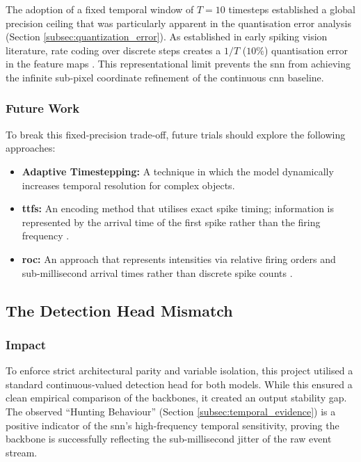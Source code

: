 The adoption of a fixed temporal window of $T=10$ timesteps established a global precision ceiling that was particularly apparent in the quantisation error analysis (Section \ref{subsec:quantization_error}). 
As established in early spiking vision literature, rate coding over discrete steps creates a $1/T$ ($10\%$) quantisation error in the feature maps \cite{THORPE2001715}. 
This representational limit prevents the \gls{snn} from achieving the infinite sub-pixel coordinate refinement of the continuous \gls{cnn} baseline.

\subsubsection*{Future Work}

To break this fixed-precision trade-off, future trials should explore the following approaches:
\begin{itemize}
    \item \textbf{Adaptive Timestepping:} A technique in which the model dynamically increases temporal resolution for complex objects.
    \item \textbf{\gls{ttfs}:} An encoding method that utilises exact spike timing; information is represented by the arrival time of the first spike rather than the firing frequency \cite{ttfs_encoding}.
    \item \textbf{\gls{roc}:} An approach that represents intensities via relative firing orders and sub-millisecond arrival times rather than discrete spike counts \cite{THORPE2001715}.
\end{itemize}

\subsection{The Detection Head Mismatch}

\subsubsection*{Impact}
To enforce strict architectural parity and variable isolation, this project utilised a standard continuous-valued detection head for both models. 
While this ensured a clean empirical comparison of the backbones, it created an output stability gap. The observed ``Hunting Behaviour'' (Section \ref{subsec:temporal_evidence}) is a positive indicator of the \gls{snn}'s high-frequency temporal sensitivity, proving the backbone is successfully reflecting the sub-millisecond jitter of the raw event stream.

